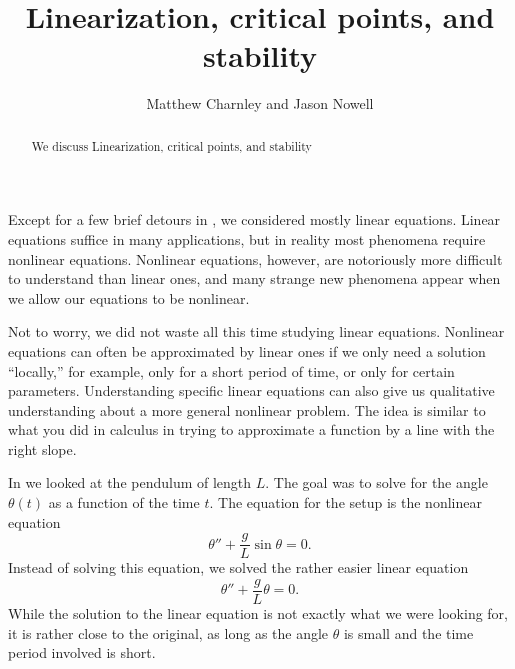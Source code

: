 \documentclass{ximera}
\title{Linearization, critical points, and stability}
\author{Matthew Charnley and Jason Nowell}
\begin{document}
\begin{abstract}
    We discuss Linearization, critical points, and stability
\end{abstract}
\maketitle

\label{linearization:section}




Except for a few brief detours in , we considered mostly linear equations.  Linear equations suffice in many applications, but in reality most phenomena require nonlinear equations.  Nonlinear equations, however, are notoriously more difficult to understand than linear ones, and many strange new phenomena appear when we allow our equations to be nonlinear.

Not to worry, we did not waste all this time studying linear equations. Nonlinear equations can often be approximated by linear ones if we only need a solution ``locally,'' for example, only for a short period of time, or only for certain parameters.  Understanding specific linear equations can also give us qualitative understanding about a more general nonlinear problem.  The idea is similar to what you did in calculus in trying to approximate a function by a line with the right slope.

\begin{mywrapfigsimp}{1.45in}{1.75in}
    \noindent
    
\end{mywrapfigsimp}
In  we looked at the pendulum of %
length $L$.  The goal was to solve for the angle $\theta(t)$ as a function of the time $t$.  The equation for the setup is the nonlinear equation
\begin{equation*}
    \theta'' + \frac{g}{L} \sin \theta = 0 .
\end{equation*}
Instead of solving this equation, we solved the rather easier linear equation
\begin{equation*}
    \theta'' + \frac{g}{L} \theta = 0 .
\end{equation*}
While the solution to the linear equation is not exactly what we were looking for, it is rather close to the original, as long as the angle $\theta$ is small and the time period involved is short.
\end{document}
